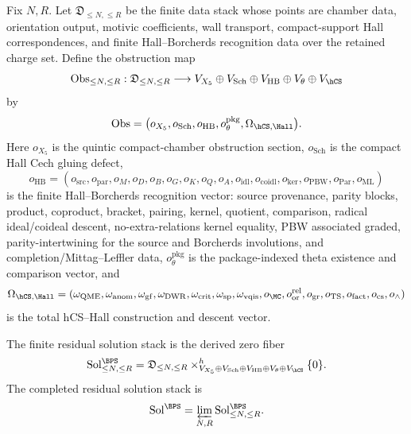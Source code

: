 \smallskip
\noindent
Fix \(N,R\). Let
\(\mathfrak D_{\leq N,\leq R}\) be the finite data stack whose points
are chamber data, orientation output, motivic coefficients, wall
transport, compact-support Hall correspondences, and finite
Hall--Borcherds recognition data over the retained charge set. Define
the obstruction map
\[
\ObsMap_{\leq N,\leq R}:
\mathfrak D_{\leq N,\leq R}
\longrightarrow
V_{X_5}
\oplus V_{\mathrm{Sch}}
\oplus V_{\mathrm{HB}}
\oplus V_{\theta}
\oplus V_{\hCS}
\]
by
\[
\ObsMap
=
\bigl(
o_{X_5},
o_{\mathrm{Sch}},
o_{\mathrm{HB}},
o_{\theta}^{\mathrm{pkg}},
\Omega_{\hCS,\Hall}
\bigr).
\]
Here \(o_{X_5}\) is the quintic compact-chamber obstruction section,
\(o_{\mathrm{Sch}}\) is the compact Hall Cech gluing defect,
\[
o_{\mathrm{HB}}
=(o_{\mathrm{src}},o_{\mathrm{par}},
 o_M,o_D,o_B,o_G,o_K,o_Q,o_A,
 o_{\mathrm{idl}},o_{\mathrm{coidl}},
 o_{\mathrm{ker}},o_{\mathrm{PBW}},o_{\mathrm{Par}},o_{\mathrm{ML}})
\]
is the finite Hall--Borcherds recognition vector: source provenance,
parity blocks, product, coproduct, bracket, pairing, kernel, quotient,
comparison, radical ideal/coideal descent, no-extra-relations kernel
equality, PBW associated graded, parity-intertwining for the source and
Borcherds involutions, and completion/Mittag--Leffler data,
\(o_{\theta}^{\mathrm{pkg}}\) is the package-indexed theta existence
and comparison vector, and
\[
\Omega_{\hCS,\Hall}
=
(\omega_{\mathrm{QME}},\omega_{\mathrm{anom}},
 \omega_{\mathrm{gf}},\omega_{\mathrm{DWR}},\omega_{\mathrm{crit}},
 \omega_{\mathrm{sp}},\omega_{\mathrm{vqis}},
 o_{\MC},o_{\mathrm{or}}^{\mathrm{rel}},o_{\mathrm{gr}},o_{\mathrm{TS}},
 o_{\mathrm{fact}},o_{\mathrm{cs}},o_{\wedge})
\]
is the total hCS--Hall construction and descent vector.

\begin{definition}
\label{def:bps-positive-derived-solution-stack}
The finite residual solution stack is the derived zero fiber
\[
\Sol^{\BPS}_{\leq N,\leq R}
=
\mathfrak D_{\leq N,\leq R}
\times^h_{
V_{X_5}\oplus V_{\mathrm{Sch}}\oplus
V_{\mathrm{HB}}\oplus V_{\theta}\oplus V_{\hCS}}
\{0\}.
\]
The completed residual solution stack is
\[
\Sol^{\BPS}
=
\varprojlim_{N,R}\Sol^{\BPS}_{\leq N,\leq R}.
\]
\end{definition}

